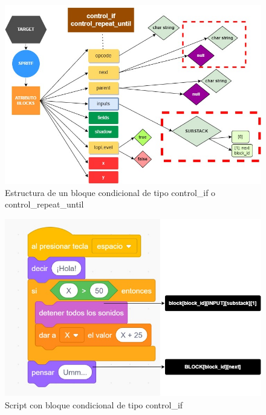 \documentclass[a4paper, 12pt]{book}
\begin{document}
\begin{figure}
	\centering
  \includegraphics[width=15cm, keepaspectratio]{img/block_controlif.jpg}
  \caption{Estructura de un bloque condicional de tipo control\_if o control\_repeat\_until}
  \label{fig:controlblock}
\end{figure}

\begin{figure}
  \centering
  \includegraphics[width=13cm, keepaspectratio]{img/scratch_control.jpg}
  \caption{Script con bloque condicional de tipo control\_if}
  \label{fig:scratch_control}
\end{figure}
\end{document}
